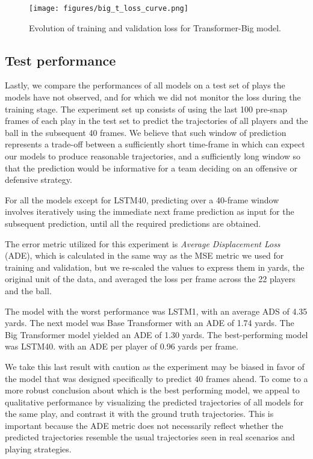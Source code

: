 \documentclass[sigconf]{acmart}
\begin{document}
\begin{figure}[htbp]
  \centering
  \texttt{[image: figures/big\_t\_loss\_curve.png]}
  \caption{Evolution of training and validation loss for Transformer-Big model.}
  \label{fig:BigT_train_val_loss}
\end{figure}

\subsection{Test performance}

Lastly, we compare the performances of all models on a test set of plays the models have not observed, and for which we did not monitor the loss during the training stage. The experiment set up consists of using the last 100 pre-snap frames of each play in the test set to predict the trajectories of all players and the ball in the subsequent 40 frames. We believe that such window of prediction represents a trade-off between a sufficiently short time-frame in which can expect our models to produce reasonable trajectories, and a sufficiently long window so that the prediction would be informative for a team deciding on an offensive or defensive strategy.

For all the models except for LSTM40, predicting over a 40-frame window involves iteratively using the immediate next frame prediction as input for the subsequent prediction, until all the required predictions are obtained.

The error metric utilized for this experiment is \textit{Average Displacement Loss} (ADE), which is calculated in the same way as the MSE metric we used for training and validation, but we re-scaled the values to express them in yards, the original unit of the data, and averaged the loss per frame across the 22 players and the ball.

The model with the worst performance was LSTM1, with an average ADS of 4.35 yards. The next model was Base Transformer with an ADE of 1.74 yards. The Big Transformer model yielded an ADE of 1.30 yards. The best-performing model was LSTM40. with an ADE per player of 0.96 yards per frame.

We take this last result with caution as the experiment may be biased in favor of the model that was designed specifically to predict 40 frames ahead. To come to a more robust conclusion about which is the best performing model, we appeal to qualitative performance by visualizing the predicted trajectories of all models for the same play, and contrast it with the ground truth trajectories. This is important because the ADE metric does not necessarily reflect whether the predicted trajectories resemble the usual trajectories seen in real scenarios and playing strategies.
\end{document}

